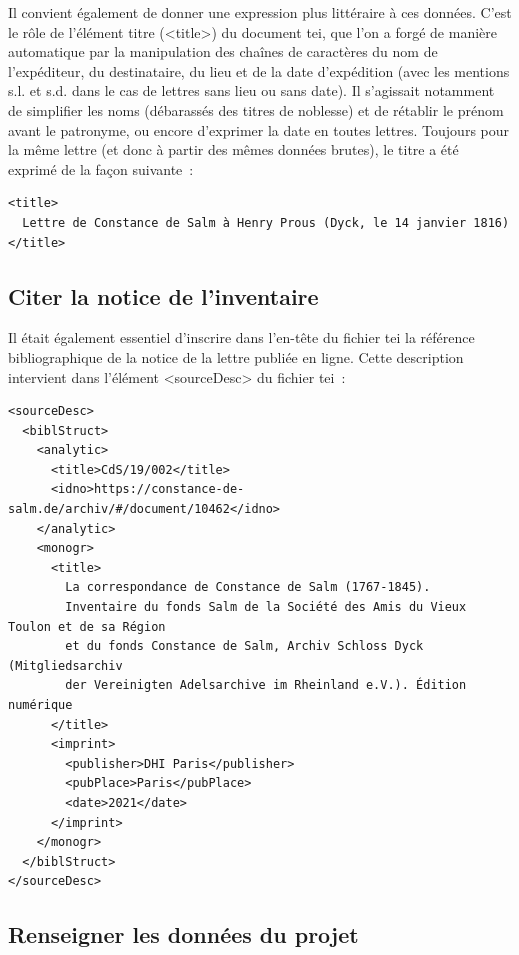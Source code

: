 \documentclass[a4paper,12pt,twoside]{book}
\begin{document}
				Il convient également de donner une expression plus littéraire à ces données. C'est le rôle de l'élément titre (\textsf{<title>}) du document \gls{tei}, que l'on a forgé de manière automatique par la manipulation des chaînes de caractères du nom de l'expéditeur, du destinataire, du lieu et de la date d'expédition (avec les mentions s.l. et s.d. dans le cas de lettres sans lieu ou sans date). Il s'agissait notamment de simplifier les noms (débarassés des titres de noblesse) et de rétablir le prénom avant le patronyme, ou encore d'exprimer la date en toutes lettres. Toujours pour la même lettre (et donc à partir des mêmes données brutes), le titre a été exprimé de la façon suivante~:
				
				\small
				\begin{verbatim}
<title>
  Lettre de Constance de Salm à Henry Prous (Dyck, le 14 janvier 1816)
</title>
				\end{verbatim}
				\normalsize
				
				
			\subsection{Citer la notice de l'inventaire}
			
				Il était également essentiel d'inscrire dans l'en-tête du fichier \gls{tei} la référence bibliographique de la notice de la lettre publiée en ligne. Cette description intervient dans l'élément \textsf{<sourceDesc>} du fichier \gls{tei}~:
				
				\small
				\begin{verbatim}
<sourceDesc>
  <biblStruct>
    <analytic>
      <title>CdS/19/002</title>
      <idno>https://constance-de-salm.de/archiv/#/document/10462</idno>
    </analytic>
    <monogr>
      <title>
        La correspondance de Constance de Salm (1767-1845). 
        Inventaire du fonds Salm de la Société des Amis du Vieux Toulon et de sa Région 
        et du fonds Constance de Salm, Archiv Schloss Dyck (Mitgliedsarchiv 
        der Vereinigten Adelsarchive im Rheinland e.V.). Édition numérique
      </title>
      <imprint>
        <publisher>DHI Paris</publisher>
        <pubPlace>Paris</pubPlace>
        <date>2021</date>
      </imprint>
    </monogr>
  </biblStruct>
</sourceDesc>
				\end{verbatim}
				\normalsize
				
			\subsection{Renseigner les données du projet}
			
\end{document}
